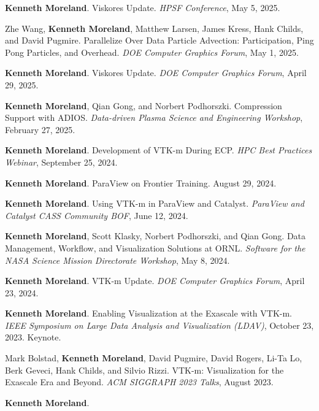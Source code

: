\begin{enumerate}[label={[\arabic*]}, left=0pt]
\item  %
  \textbf{Kenneth Moreland}.
  Viskores Update.
  \emph{HPSF Conference}, May 5, 2025.
\item  %
  Zhe Wang, \textbf{Kenneth Moreland}, Matthew Larsen, James Kress, Hank Childs, and David Pugmire.
  Parallelize Over Data Particle Advection: Participation, Ping Pong Particles, and Overhead.
  \emph{DOE Computer Graphics Forum}, May 1, 2025.
\item  %
  \textbf{Kenneth Moreland}.
  Viskores Update.
  \emph{DOE Computer Graphics Forum}, April 29, 2025.
\item  %
  \textbf{Kenneth Moreland}, Qian Gong, and Norbert Podhorszki.
  Compression Support with ADIOS.
  \emph{Data-driven Plasma Science and Engineering Workshop}, February 27, 2025.
\item  %
  \textbf{Kenneth Moreland}.
  Development of VTK-m During ECP.
  \emph{HPC Best Practices Webinar}, September 25, 2024.
\item  %
  \textbf{Kenneth Moreland}.
  ParaView on Frontier Training.
August 29, 2024.
\item  %
  \textbf{Kenneth Moreland}.
  Using VTK-m in ParaView and Catalyst.
  \emph{ParaView and Catalyst CASS Community BOF}, June 12, 2024.
\item  %
  \textbf{Kenneth Moreland}, Scott Klasky, Norbert Podhorszki, and Qian Gong.
  Data Management, Workflow, and Visualization Solutions at ORNL.
  \emph{Software for the NASA Science Mission Directorate Workshop}, May 8, 2024.
\item  %
  \textbf{Kenneth Moreland}.
  VTK-m Update.
  \emph{DOE Computer Graphics Forum}, April 23, 2024.
\item  %
  \textbf{Kenneth Moreland}.
  Enabling Visualization at the Exascale with VTK-m.
  \emph{IEEE Symposium on Large Data Analysis and Visualization (LDAV)}, October 23, 2023.
Keynote.\item  %
  Mark Bolstad, \textbf{Kenneth Moreland}, David Pugmire, David Rogers, Li-Ta Lo, Berk Geveci, Hank Childs, and Silvio Rizzi.
  VTK-m: Visualization for the Exascale Era and Beyond.
  \emph{ACM SIGGRAPH 2023 Talks}, August 2023.
\item  %
  \textbf{Kenneth Moreland}.

\end{enumerate}
